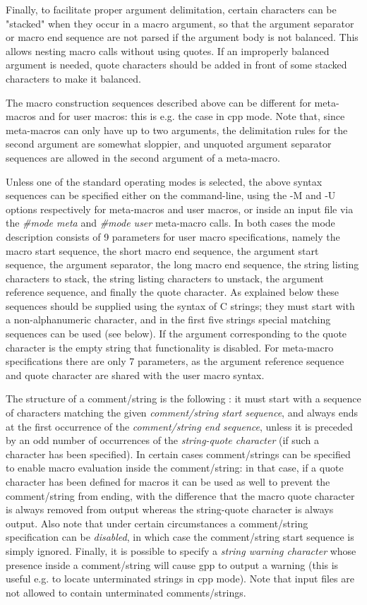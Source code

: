Finally, to facilitate proper argument delimitation, certain characters can
be "stacked" when they occur in a macro argument, so that the argument
separator or macro end sequence are not parsed if the argument body is not
balanced. This allows nesting macro calls without using quotes. If an
improperly balanced argument is needed, quote characters should be added in
front of some stacked characters to make it balanced.


The macro construction sequences described above can be different for
meta-macros and for user macros: this is e.g. the case in cpp mode.
Note that, since meta-macros can only have up to two arguments, the
delimitation rules for the second argument are somewhat sloppier, and
unquoted argument separator sequences are allowed in the second argument
of a meta-macro.


Unless one of the standard operating modes is selected, the above syntax
sequences can be specified either on the command-line, using the -M and
-U options respectively for meta-macros and user macros, or inside an
input file via the {\it \#mode meta} and {\it \#mode user} meta-macro calls.
In both cases the mode description consists of 9 parameters for user macro
specifications, namely the macro start sequence, the short macro end
sequence, the argument start sequence, the argument separator, the long
macro end sequence, the string listing characters to stack, the string
listing characters to unstack, the argument reference sequence, and finally
the quote character. As explained below these sequences should be supplied
using the syntax of C strings; they must start with a non-alphanumeric 
character, and in the first five strings special matching sequences can
be used (see below). If the argument corresponding to the quote character
is the empty string that functionality is disabled. For meta-macro
specifications there are only 7 parameters, as the argument reference
sequence and quote character are shared with the user macro syntax.


The structure of a comment/string is the following : it must start with a
sequence of characters matching the given {\it comment/string start sequence}, 
and always ends at the first occurrence of the {\it comment/string end
sequence}, unless it is preceded by an odd number of occurrences of the
{\it string-quote character} (if such a character has been specified).
In certain cases comment/strings can be specified to enable macro evaluation
inside the comment/string: in that case, if a quote character has been
defined for macros it can be used as well to prevent the comment/string from
ending, with the difference that the macro quote character is always removed
from output whereas the string-quote character is always output. Also note
that under certain circumstances a comment/string specification can be
{\it disabled}, in which case the comment/string start sequence is simply
ignored. Finally, it is possible to specify a {\it string warning character}
whose presence inside a comment/string will cause gpp to output a warning
(this is useful e.g. to locate unterminated strings in cpp mode).
Note that input files are not allowed to contain unterminated comments/strings.


